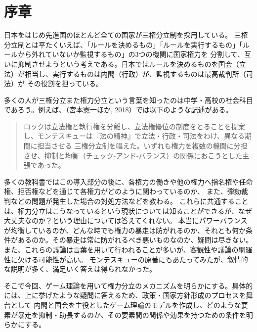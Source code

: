\documentclass[main.tex]{subfiles}
\begin{document}
\section*{序章}
\setcounter{page}{1}

日本をはじめ先進国のほとんど全ての国家が三権分立制を採用している。
三権分立制とは平たくいえば、「ルールを決めるもの」「ルールを実行するもの」「ルールから外れていないか監視するもの」の3つの機関に国家権力を
分割して、互いに抑制させようという考えである。日本ではルールを決めるものを国会（立法）が相当し、実行するものは内閣（行政）が、監視するものは最高裁判所（司法）が
その役割を担っている。

多くの人が三権分立また権力分立という言葉を知ったのは中学・高校の社会科目であろう。例えば、（宮本憲一ほか, 2018）では以下のような記述がある。
\begin{quote}
  ロックは立法権と執行権を分離し、立法権優位の制度をとることを提案し、モンテスキューは『法の精神』で立法・行政・司法をわけ、異なる期間に担当させる
  三権分立制を唱えた。いずれも権力を複数の機関に分担させ、抑制と均衡（チェック-アンド-バランス）の関係におこうとした主張であった。
\end{quote}
多くの教科書ではこの導入部分の後に、各権力の働きや他の権力へ指名権や任命権、拒否権などを通じて各権力がどのように関わっているのか、
また、弾劾裁判などの問題が発生した場合の対処方法などを教わる。
これらに共通することは、権力分立はこうなっているという現状については知ることができるが、なぜ大丈夫なのか？という理由については答えてくれない。
本当にパワーバランスが均衡しているのか、どんな時でも権力の暴走は防がれるのか、それとも何か条件があるのか。その暴走は常に防がれるべき悪いものなのか、疑問は尽きない。
また、これらの議論は言葉を用いて行われることが多いが、客観性や議論の網羅性に欠ける可能性が高い。
モンテスキューの原著にもあたってみたが、叙情的な説明が多く、満足いく答えは得られなかった。

そこで今回、ゲーム理論を用いて権力分立のメカニズムを明らかにする。具体的には、上に挙げたような疑問に答えるため、政策・国家方針形成のプロセスを舞台として
内閣と国会を主役としたゲーム理論のモデルを作成し、どのような要素が暴走を抑制・助長するのか、その要素間の関係や効果を持つための条件を明らかにする。
\end{document}
